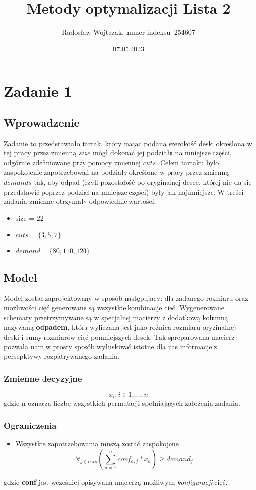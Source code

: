 \documentclass[a4paper,14pt]{report}
\title{Metody optymalizacji Lista 2}
\author{Radosław Wojtczak, numer indeksu: 254607}
\date{07.05.2023}
\begin{document}
\maketitle
\tableofcontents
\chapter{Zadanie 1}
\section{Wprowadzenie}
    Zadanie to przedstawiało tartak, który mając podaną szerokość deski określoną w tej pracy przez zmienną $size$ mógł 
    dokonać jej podziału na mniejsze części, odgórnie zdefiniowane przy pomocy zmiennej $cuts$. Celem tartaku było zaspokojenie 
    zapotrzebowań na podziały określone w pracy przez zmienną $demands$ tak, aby odpad (czyli pozostałość po oryginalnej desce, której 
    nie da się przedstawić poprzez podział na mniejsze części) były jak najmniejsze.
    W treści zadania zmienne otrzymały odpowiednie wartości:
    \begin{itemize}
        \item size = 22
        \item $cuts = \{3,5,7\}$
        \item $demand = \{80,110,120\} $
    \end{itemize}
\section{Model}
    Model został zaprojektowany w sposób następujacy: dla zadanego rozmiaru oraz możliwości cięć generowane są wszystkie kombinacje cięć. 
    Wygenerowane schematy przetrzymywane są w specjalnej macierzy z dodatkową kolumną nazywaną \textbf{odpadem}, która wyliczana jest jako 
    rożnica rozmiaru oryginalnej deski i sumy rozmiarów cięć pomniejszych desek. Tak spreparowana macierz pozwala nam w prosty sposób 
    wyłuskiwać istotne dla nas informacje z persepktywy rozpatrywanego zadania.
    \subsection{Zmienne decyzyjne}
        \begin{equation}
            x_{i}: i \in 1,...,n
        \end{equation}
        gdzie n oznacza liczbę wszystkich permutacji spełniających założenia zadania.
    \subsection{Ograniczenia}
        \begin{itemize}
            \item Wszystkie zapotrzebowania muszą zostać zaspokojone
            \begin{equation}
            \forall_{j \in cuts}  (\sum_{a=1}^{n} conf_{a,j} * x_{a} ) \geq demand_{j}   
            \end{equation}
        \end{itemize}
        gdzie \textbf{conf} jest wcześniej opisywaną macierzą możliwych \textit{konfiguracji} cięć.
\end{document}
